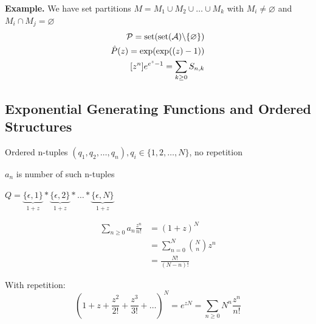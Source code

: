 \textbf{Example.}
We have set partitions $M = M_1 \cup M_2 \cup \ldots \cup M_k$ with $M_i \neq \varnothing$ and $M_i \cap M_j = \varnothing$
\begin{align*}
  \mathcal{P} = \operatorname{set}( \operatorname{set}( \mathcal{A}) \backslash \{\varnothing\} ) \\
  \hat{P}(z) = \exp(\exp((z) - 1)) \\
  [z^n] e^{e^z - 1} = \sum_{k\geq 0 } S_{n,k} \\
\end{align*}

\subsection{Exponential Generating Functions and Ordered Structures}

Ordered n-tuples $(q_1,q_2, \ldots, q_n), q_i \in \{1,2, \ldots, N\}$, no repetition

$a_n$ is number of such n-tuples

$Q = \underbrace{\{\epsilon,1\}}_{1+z} *
     \underbrace{\{\epsilon,2\}}_{1+z} * \ldots *
     \underbrace{\{\epsilon,N\}}_{1+z} $

\begin{align*}
  \sum_{n\geq 0} a_n \frac{z^n}{n!} &=
    (1+z)^N \\
    &= \sum_{n=0} ^{N} {N \choose n} z^n \\
    &= \frac{N!}{(N-n)!}
\end{align*}

With repetition:
\[
  (1+z+ \frac{z^2}{2!} + \frac{z^3}{3!} + \ldots)^N
    = e^{zN} = \sum_{n\geq 0} N^n \frac{z^n}{n!}
\]
